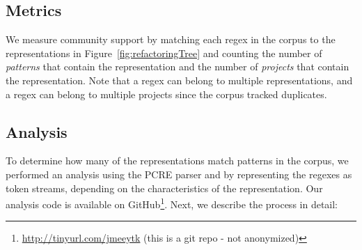\subsection{Metrics}
\label{sec:communitymetric}
We measure community support by matching each regex in the corpus to the representations in Figure~\ref{fig:refactoringTree} and counting the number of \emph{patterns} that contain the representation and the number of \emph{projects} that contain the representation.
Note that a regex can belong to multiple representations, and a regex can belong to multiple projects since the corpus tracked duplicates. %
%
%









\subsection{Analysis}
\label{communityanalysis}
To determine how many of the representations match patterns in the corpus, we performed an analysis using the PCRE parser and by representing the regexes as token streams, depending on the characteristics of the representation. Our analysis code is available on GitHub\footnote{\url{http://tinyurl.com/jmeeytk} (this is a git repo - not anonymized)}. Next, we describe the process in detail:

